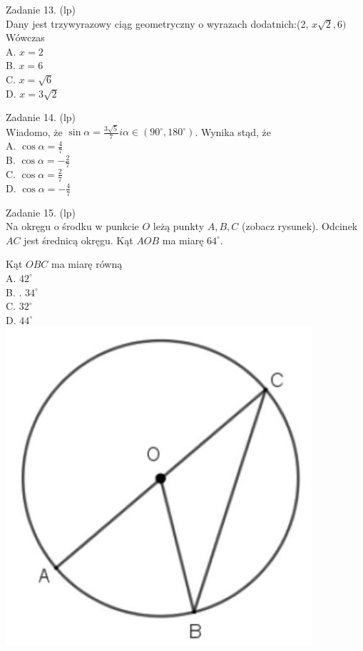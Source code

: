 \documentclass[10pt]{article}
\begin{document}
Zadanie 13. (lp)\\
Dany jest trzywyrazowy ciąg geometryczny o wyrazach dodatnich:(2, \(x \sqrt{2}, 6)\) Wówczas\\
A. \(x=2\)\\
B. \(x=6\)\\
C. \(x=\sqrt{6}\)\\
D. \(x=3 \sqrt{2}\)

Zadanie 14. (lp)\\
Wiadomo, że \(\sin \alpha=\frac{3 \sqrt{5}}{7} i \alpha \in\left(90^{\circ}, 180^{\circ}\right)\). Wynika stąd, że\\
A. \(\cos \alpha=\frac{4}{7}\)\\
B. \(\cos \alpha=-\frac{2}{7}\)\\
C. \(\cos \alpha=\frac{2}{7}\)\\
D. \(\cos \alpha=-\frac{4}{7}\)

Zadanie 15. (lp)\\
Na okręgu o środku w punkcie \(O\) leżą punkty \(A, B, C\) (zobacz rysunek). Odcinek \(A C\) jest średnicą okręgu. Kąt \(A O B\) ma miarę \(64^{\circ}\).

Kąt \(O B C\) ma miarę równą\\
A. \(42^{\circ}\)\\
B. . \(34^{\circ}\)\\
C. \(32^{\circ}\)\\
D. \(44^{\circ}\)\\
\includegraphics[max width=\textwidth, center]{2024_11_21_c2f4637e26cc7e4291d3g-04(1)}
\end{document}
